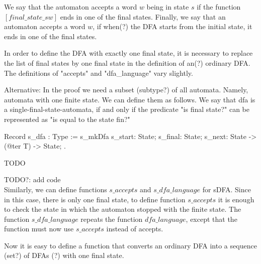 We say that the automaton accepts a word $w$ being in state $s$ if the function $[final\_state \_ s w]$ ends in one of the final states. Finally, we say that an automaton accepts a word $w$, if when(?) the DFA starts from the initial state, it ends in one of the final states.



In order to define the DFA with exactly one final state, it is necessary to replace the list of final states by one final state in the definition of an(?) ordinary DFA. The definitions of "accepts" and "dfa\_language" vary slightly.

Alternative: In the proof we need a subset (subtype?) of all automata. Namely, automata with one finite state. We can define them as follows. We say that dfa is a single-final-state-automata, if and only if the predicate "is final state?" can be represented as "is equal to the state fin?"

\begin{listing}[h]
	\begin{pyglist}[language=coq, numbers=none, numbersep=5pt]
  Record s_dfa : Type :=
    s_mkDfa {
      s_start: State;
      s_final: State;
      s_next: State -> (@ter T) -> State;
  }.      
	\end{pyglist}
	\caption{TODO}
	\label{lst:verbments1}
\end{listing}
  
TODO?: add code\\

Similarly, we can define functions $s\_accepts$ and $s\_dfa\_language$ for sDFA. Since in this case, there is only one final state, to define function $s\_accepts$ it is enough to check the state in which the automaton stopped with the finite state. The function $s\_dfa\_language$ repeats the function $dfa\_language$, except that the function must now use $s\_accepts$ instead of accepts.



Now it is easy to define a function that converts an ordinary DFA into a sequence (set?) of DFAs (?) with one final state.

